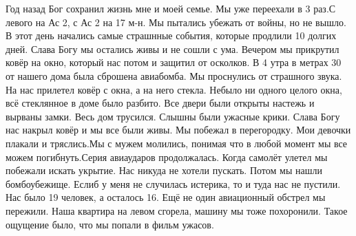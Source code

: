  
 
 
 
 

\qqSecCmt


Год назад Бог сохранил жизнь мне и моей семье. Мы уже переехали в 3 раз.С
левого на Ас 2, с Ас 2 на 17 м-н. Мы пытались убежать от войны, но не вышло. В
этот день начались самые страшнные события, которые продлили 10 долгих дней.
Слава Богу мы остались живы и не сошли с ума. Вечером мы прикрутил ковёр на
окно, который нас потом и защитил от осколков. В 4 утра в метрах 30 от нашего
дома была сброшена авиабомба. Мы проснулись от страшного звука. На нас прилетел
ковёр с окна, а на него стекла. Небыло ни одного целого окна, всё стеклянное в
доме было разбито. Все двери были открыты настежь и вырваны замки. Весь дом
трусился. Слышны были ужасные крики. Слава Богу нас накрыл ковёр и мы все были
живы. Мы побежал в перегородку. Мои девочки плакали и тряслись.Мы с мужем
молились, понимая что в любой момент мы все можем погибнуть.Серия авиаударов
продолжалась. Когда самолёт улетел мы побежали искать укрытие. Нас никуда не
хотели пускать. Потом мы нашли бомбоубежище. Еслиб у меня не случилась
истерика, то и туда нас не пустили. Нас было 19 человек, а осталось 16. Ещё не
один авиационный обстрел мы пережили. Наша квартира на левом сгорела, машину мы
тоже похоронили. Такое ощущение было, что мы попали в фильм ужасов.
